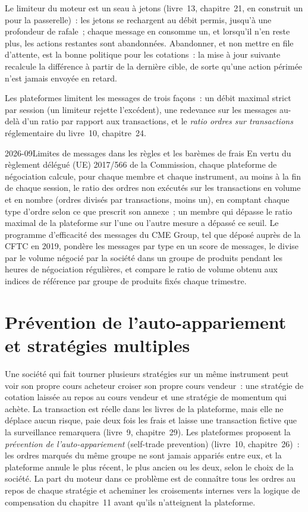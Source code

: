 Le limiteur du moteur est un seau à jetons (livre~13, chapitre~21, en construit un pour la passerelle)~: les jetons se rechargent au débit permis, jusqu'à une
profondeur de rafale~; chaque message en consomme un, et lorsqu'il n'en reste plus, les actions restantes sont abandonnées. Abandonner, et non mettre en file d'attente, est la bonne politique pour les cotations~: la
mise à jour suivante recalcule la différence à partir de la dernière cible, de sorte qu'une action périmée n'est jamais envoyée en retard.

Les plateformes limitent les messages de trois façons~: un débit maximal strict par session (un limiteur rejette l'excédent), une redevance sur les messages au-delà d'un ratio par rapport aux transactions, et le
\emph{ratio ordres sur transactions} réglementaire du livre~10, chapitre~24.

\begin{dated}{2026-09}{Limites de messages dans les règles et les barèmes de frais}\label{dat:hf:the-quoting-engine:limits}
En vertu du règlement délégué (UE) 2017/566 de la Commission, chaque plateforme de négociation calcule, pour chaque membre et chaque instrument, au moins à la fin de chaque
session, le ratio des ordres non exécutés sur les transactions en volume et en nombre (ordres divisés par transactions, moins un), en comptant chaque type d'ordre
selon ce que prescrit son annexe~; un membre qui dépasse le ratio maximal de la plateforme sur l'une ou l'autre mesure a dépassé ce seuil. Le programme d'efficacité des messages du CME Group,
tel que déposé auprès de la CFTC en 2019, pondère les messages par type en un score de messages, le divise par le volume négocié par la société dans un groupe de produits
pendant les heures de négociation régulières, et compare le ratio de volume obtenu aux indices de référence par groupe de produits fixés chaque trimestre.
\end{dated}

\section{Prévention de l'auto-appariement et stratégies multiples}

Une société qui fait tourner plusieurs stratégies sur un même instrument peut voir son propre cours acheteur croiser son propre cours vendeur~: une stratégie de cotation laissée au repos au cours vendeur et une
stratégie de momentum qui achète. La transaction est réelle dans les livres de la plateforme, mais elle ne déplace aucun risque, paie deux fois les frais et laisse une transaction fictive que la surveillance
remarquera (livre~9, chapitre~29). Les plateformes proposent la \emph{prévention de l'auto-appariement} (self-trade prevention) (livre~10, chapitre~26)~: les ordres marqués du même groupe
ne sont jamais appariés entre eux, et la plateforme annule le plus récent, le plus ancien ou les deux, selon le choix de la société. La part du moteur dans ce problème est de
connaître tous les ordres au repos de chaque stratégie et acheminer les croisements internes vers la logique de compensation du chapitre~11 avant qu'ils n'atteignent la plateforme.

